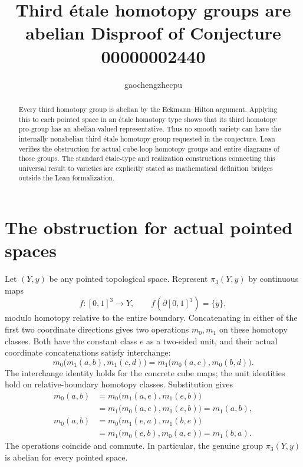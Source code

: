 \documentclass[11pt]{article}
\title{Third \'etale homotopy groups are abelian\newline
\large Disproof of Conjecture 00000002440}
\author{gaochengzhecpu}\date{}
\begin{document}
\maketitle
\begin{abstract}
Every third homotopy group is abelian by the Eckmann--Hilton
argument. Applying this to each pointed space in an \'etale
homotopy type shows that its third homotopy pro-group has an
abelian-valued representative. Thus no smooth variety can have
the internally nonabelian third \'etale homotopy group requested
in the conjecture. Lean verifies the obstruction for actual
cube-loop homotopy groups and entire diagrams of those groups.
The standard \'etale-type and realization constructions connecting
this universal result to varieties are explicitly stated as
mathematical definition bridges outside the Lean formalization.
\end{abstract}

\section*{The obstruction for actual pointed spaces}
Let $(Y,y)$ be any pointed topological space.
Represent $\pi_3(Y,y)$ by continuous maps
\[
 f:[0,1]^3\longrightarrow Y,\qquad f(\partial[0,1]^3)=\{y\},
\]
modulo homotopy relative to the entire boundary. Concatenating
in either of the first two coordinate directions gives two
operations $m_0,m_1$ on these homotopy classes. Both have the
constant class $e$ as a two-sided unit, and their actual
coordinate concatenations satisfy interchange:
\[
 m_0\bigl(m_1(a,b),m_1(c,d)\bigr)
 =m_1\bigl(m_0(a,c),m_0(b,d)\bigr).
\]
The interchange identity holds for the concrete cube maps;
the unit identities hold on relative-boundary homotopy classes.
Substitution gives
\begin{align*}
 m_0(a,b)
 &=m_0\bigl(m_1(a,e),m_1(e,b)\bigr)\\
 &=m_1\bigl(m_0(a,e),m_0(e,b)\bigr)=m_1(a,b),\\
 m_0(a,b)
 &=m_0\bigl(m_1(e,a),m_1(b,e)\bigr)\\
 &=m_1\bigl(m_0(e,b),m_0(a,e)\bigr)=m_1(b,a).
\end{align*}
The operations coincide and commute. In particular, the genuine
group $\pi_3(Y,y)$ is abelian for every pointed space.

\newpage
\end{document}

